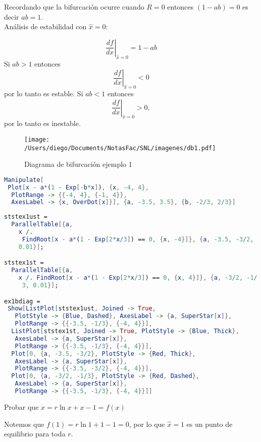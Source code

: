 Recordando que la bifurcación ocurre cuando $R=0$ entonces  $(1-ab)=0$ es decir $ab=1$. \\

Análisis de estabilidad con $\hat{x}=0$:

$$
\left. \frac{df}{dx} \right|_{\hat{x}=0} = 1-ab
$$
Si $ab>1$ entonces $$
\left. \frac{df}{dx} \right|_{\hat{x}=0} <0
$$
por lo tanto es estable.
Si $ab<1$ entonces
 $$
\left. \frac{df}{dx} \right|_{\hat{x}=0} >0, 
$$
por lo tanto es inestable.

\begin{figure}[htpb]
  \centering
  \texttt{[image: /Users/diego/Documents/NotasFac/SNL/imagenes/db1.pdf]}
  \caption{Diagrama de bifurcación ejemplo 1}
\end{figure}

\begin{lstlisting}[language=Mathematica]
Manipulate[
 Plot[x - a*(1 - Exp[-b*x]), {x, -4, 4}, 
  PlotRange -> {{-4, 4}, {-1, 4}}, 
  AxesLabel -> {x, OverDot[x]}], {a, -3.5, 3.5}, {b, -2/3, 2/3}]
\end{lstlisting}  

\begin{lstlisting}[language=Mathematica]
ststex1ust = 
  ParallelTable[{a, 
    x /. 
     FindRoot[x - a*(1 - Exp[2*x/3]) == 0, {x, -4}]}, {a, -3.5, -3/2, 
    0.01}];

ststex1st = 
  ParallelTable[{a, 
    x /. FindRoot[x - a*(1 - Exp[2*x/3]) == 0, {x, 4}]}, {a, -3/2, -1/
     3, 0.01}];

ex1bdiag = 
 Show[ListPlot[ststex1ust, Joined -> True, 
   PlotStyle -> {Blue, Dashed}, AxesLabel -> {a, SuperStar[x]}, 
   PlotRange -> {{-3.5, -1/3}, {-4, 4}}], 
  ListPlot[ststex1st, Joined -> True, PlotStyle -> {Blue, Thick}, 
   AxesLabel -> {a, SuperStar[x]}, 
   PlotRange -> {{-3.5, -1/3}, {-4, 4}}], 
  Plot[0, {a, -3.5, -3/2}, PlotStyle -> {Red, Thick}, 
   AxesLabel -> {a, SuperStar[x]}, 
   PlotRange -> {{-3.5, -3/2}, {-4, 4}}], 
  Plot[0, {a, -3/2, -1/3}, PlotStyle -> {Red, Dashed}, 
   AxesLabel -> {a, SuperStar[x]}, 
   PlotRange -> {{-3.5, -1/3}, {-4, 4}}]]
\end{lstlisting}  

\begin{ejemplo}
  Probar que $ \dot{x}=r\ln x+x-1=f(x)$
\end{ejemplo}
Notemos que $f(1)=r\ln 1+1-1=0$, por lo que $\hat{x}=1$ es un punto de equilibrio para toda $r$.

